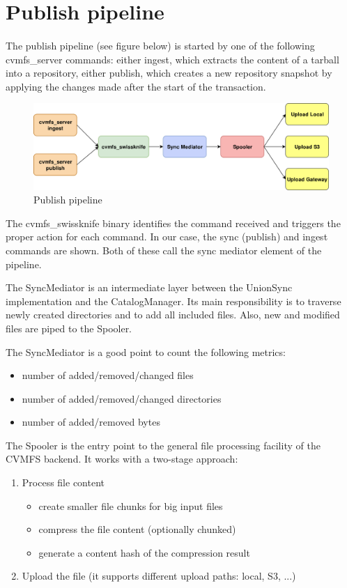 \section{Publish pipeline}
\paragraph{}
The publish pipeline (see figure below) is started by one of the following cvmfs\_server commands: either ingest, which extracts the content of a tarball into a repository, either publish, which creates a new repository snapshot by applying the changes made after the start of the transaction.
\begin{figure}[h]
\centering
\includegraphics[scale=0.17]{figures/publish_pipeline2}
\caption{Publish pipeline}
\end{figure}
\par
The cvmfs\_swissknife binary identifies the command received and triggers the proper action for each command. In our case, the sync (publish) and ingest commands are shown. Both of these call the sync mediator element of the pipeline.
\par
The SyncMediator is an intermediate layer between the UnionSync implementation and the CatalogManager. Its main responsibility is to traverse newly created directories and to add all included files. Also, new and modified files are piped to the Spooler.
\par 
The SyncMediator is a good point to count the following metrics:
\begin{itemize}
  \item number of added/removed/changed files
  \item number of added/removed/changed directories
  \item number of added/removed bytes
\end{itemize}

\par
The Spooler is the entry point to the general file processing facility of the CVMFS backend. It works with a two-stage approach:
\begin{enumerate}
  \item Process file content
  \begin{itemize}
    \item create smaller file chunks for big input files
    \item compress the file content (optionally chunked)
    \item generate a content hash of the compression result
    \end{itemize}
  \item Upload the file (it supports different upload paths: local, S3, ...)
\end{enumerate}

